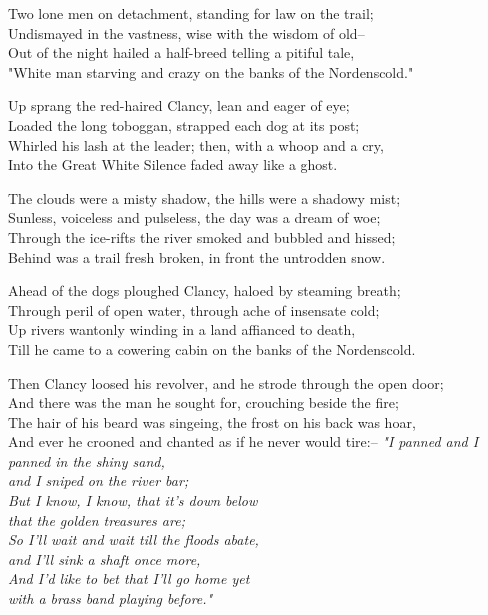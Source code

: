 \begin{poemblock}
 Two lone men on detachment, standing for law on the trail;\\
\idt Undismayed in the vastness, wise with the wisdom of old--\\
 Out of the night hailed a half-breed telling a pitiful tale,\\
\idt "White man starving and crazy on the banks of the Nordenscold."

 Up sprang the red-haired Clancy, lean and eager of eye;\\
\idt Loaded the long toboggan, strapped each dog at its post;\\
 Whirled his lash at the leader; then, with a whoop and a cry,\\
\idt Into the Great White Silence faded away like a ghost.

 The clouds were a misty shadow, the hills were a shadowy mist;\\
\idt Sunless, voiceless and pulseless, the day was a dream of woe;\\
 Through the ice-rifts the river smoked and bubbled and hissed;\\
\idt Behind was a trail fresh broken, in front the untrodden snow.

 Ahead of the dogs ploughed Clancy, haloed by steaming breath;\\
\idt Through peril of open water, through ache of insensate cold;\\
 Up rivers wantonly winding in a land affianced to death,\\
\idt Till he came to a cowering cabin on the banks of the Nordenscold.

 Then Clancy loosed his revolver, and he strode through the open door;\\
\idt And there was the man he sought for, crouching beside the fire;\\
 The hair of his beard was singeing, the frost on his back was hoar,\\
\idt And ever he crooned and chanted as if he never would tire:--
\textit{
\idt "I panned and I panned in the shiny sand,\\
and I sniped on the river bar;\\
\idt But I know, I know, that it's down below\\
that the golden treasures are;\\
\idt So I'll wait and wait till the floods abate,\\
and I'll sink a shaft once more,\\
\idt And I'd like to bet that I'll go home yet\\
with a brass band playing before."
}


\end{poemblock}
